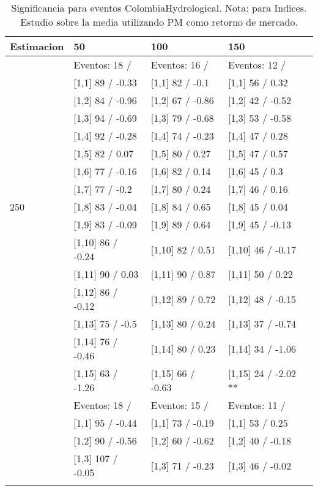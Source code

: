 \begin{table}

\caption{Significancia para eventos ColombiaHydrological. Nota: para Indices. Estudio sobre la media utilizando PM como retorno de mercado.}
\centering
\begin{tabular}[t]{llll}
\toprule
Estimacion & 50 & 100 & 150\\
\midrule
 & Eventos:  18 / & Eventos:  16 / & Eventos:  12 /\\
 & {}[1,1] 89  / -0.33 & {}[1,1] 82  / -0.1 & {}[1,1] 56  / 0.32\\
 & {}[1,2] 84  / -0.96 & {}[1,2] 67  / -0.86 & {}[1,2] 42  / -0.52\\
 & {}[1,3] 94  / -0.69 & {}[1,3] 79  / -0.68 & {}[1,3] 53  / -0.58\\
 & {}[1,4] 92  / -0.28 & {}[1,4] 74  / -0.23 & {}[1,4] 47  / 0.28\\
\addlinespace
 & {}[1,5] 82  / 0.07 & {}[1,5] 80  / 0.27 & {}[1,5] 47  / 0.57\\
 & {}[1,6] 77  / -0.16 & {}[1,6] 82  / 0.14 & {}[1,6] 45  / 0.3\\
 & {}[1,7] 77  / -0.2 & {}[1,7] 80  / 0.24 & {}[1,7] 46  / 0.16\\
250 & {}[1,8] 83  / -0.04 & {}[1,8] 84  / 0.65 & {}[1,8] 45  / 0.04\\
 & {}[1,9] 83  / -0.09 & {}[1,9] 89  / 0.64 & {}[1,9] 45  / -0.13\\
\addlinespace
 & {}[1,10] 86  / -0.24 & {}[1,10] 82  / 0.51 & {}[1,10] 46  / -0.17\\
 & {}[1,11] 90  / 0.03 & {}[1,11] 90  / 0.87 & {}[1,11] 50  / 0.22\\
 & {}[1,12] 86  / -0.12 & {}[1,12] 89  / 0.72 & {}[1,12] 48  / -0.15\\
 & {}[1,13] 75  / -0.5 & {}[1,13] 80  / 0.24 & {}[1,13] 37  / -0.74\\
 & {}[1,14] 76  / -0.46 & {}[1,14] 80  / 0.23 & {}[1,14] 34  / -1.06\\
\addlinespace
 & {}[1,15] 63  / -1.26 & {}[1,15] 66  / -0.63 & {}[1,15] 24  / -2.02 **\\
 & Eventos:  18 / & Eventos:  15 / & Eventos:  11 /\\
 & {}[1,1] 95  / -0.44 & {}[1,1] 73  / -0.19 & {}[1,1] 53  / 0.25\\
 & {}[1,2] 90  / -0.56 & {}[1,2] 60  / -0.62 & {}[1,2] 40  / -0.18\\
 & {}[1,3] 107  / -0.05 & {}[1,3] 71  / -0.23 & {}[1,3] 46  / -0.02\\
\addlinespace

\end{tabular}
\end{table}
